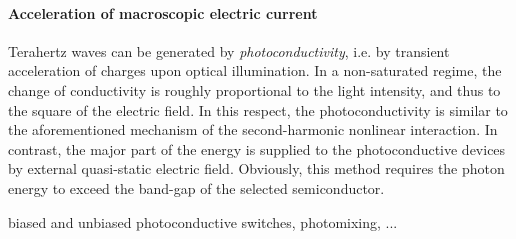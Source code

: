 \paragraph{Acceleration of macroscopic electric current}%
Terahertz waves can be generated by \textit{photoconductivity}, i.e. by transient acceleration of charges upon optical illumination.
In a non-saturated regime, the change of conductivity is roughly proportional to the light intensity, and thus to the square of the electric field. In this respect, the photoconductivity is similar to the aforementioned mechanism of the second-harmonic nonlinear interaction. In contrast, the major part of the energy is supplied to the photoconductive devices by external quasi-static electric field. Obviously, this method requires the photon energy to exceed the band-gap of the selected semiconductor.



 biased and unbiased photoconductive switches, photomixing, ...




